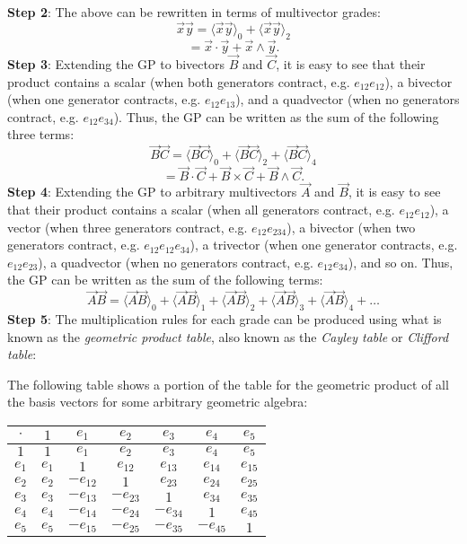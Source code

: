 \documentclass{article}
\newcommand{\mycaption}[2][nolabel]{%
  \ifthenelse{\equal{#1}{label}}{\refstepcounter{table}\caption{#2}\label{table:\thetable}}{\caption*{#2}}%
}
\begin{document}
\begin{enumerate}
    \subitem \textbf{Step 2}: The above can be rewritten in terms of multivector grades:
    $$\vec{x}\vec{y} = \langle \vec{x} \vec{y} \rangle_0 + \langle \vec{x} \vec{y} \rangle_2$$
    $$ = \vec{x} \cdot \vec{y} + \vec{x} \wedge \vec{y}.$$
    \subitem \textbf{Step 3}: Extending the GP to bivectors $\vec{B}$ and $\vec{C}$, it is easy to see that their product contains 
    a scalar (when both generators contract, e.g. $e_{12} e_{12}$), a bivector (when one generator contracts, e.g. $e_{12} e_{13}$), and 
    a quadvector (when no generators contract, e.g. $e_{12} e_{34}$). Thus, the GP can be written as the sum of the following three terms:
    $$\vec{B}\vec{C} = \langle \vec{B} \vec{C} \rangle_0 + \langle \vec{B} \vec{C} \rangle_2 + \langle \vec{B} \vec{C} \rangle_4$$
    $$ = \vec{B} \cdot \vec{C} + \vec{B} \times \vec{C} + \vec{B} \wedge \vec{C}.$$
    \subitem \textbf{Step 4}: Extending the GP to arbitrary multivectors $\vec{A}$ and $\vec{B}$, 
    it is easy to see that their product contains
    a scalar (when all generators contract, e.g. $e_{12} e_{12}$), 
    a vector (when three generators contract, e.g. $e_{12} e_{234}$),
    a bivector (when two generators contract, e.g. $e_{12} e_{12} e_{34}$),
    a trivector (when one generator contracts, e.g. $e_{12} e_{23}$),
    a quadvector (when no generators contract, e.g. $e_{12} e_{34}$), and so on.
    Thus, the GP can be written as the sum of the following terms:
    $$\vec{A}\vec{B} = \langle \vec{A} \vec{B} \rangle_0 + \langle \vec{A} \vec{B} \rangle_1 + \langle \vec{A} \vec{B} \rangle_2 + \langle \vec{A} \vec{B} \rangle_3 + \langle \vec{A} \vec{B} \rangle_4 + \ldots$$
    \subitem \textbf{Step 5}: The multiplication rules for each grade can be produced using what is known as the \emph{geometric product table}, 
    also known as the \emph{Cayley table} or \emph{Clifford table}:

    The following table shows a portion of the table for the geometric product of all the basis vectors for some 
    arbitrary geometric algebra:
    \begin{center}
    \begin{tabular}{|c|c|c|c|c|c|c|}
    \hline
    $\cdot$ & $1$ & $e_1$ & $e_2$ & $e_3$ & $e_4$ & $e_5$ \\
    \hline
    $1$ & $1$ & $e_1$ & $e_2$ & $e_3$ & $e_4$ & $e_5$ \\
    \hline
    $e_1$ & $e_1$ & $1$ & $e_{12}$ & $e_{13}$ & $e_{14}$ & $e_{15}$ \\
    \hline
    $e_2$ & $e_2$ & $-e_{12}$ & $1$ & $e_{23}$ & $e_{24}$ & $e_{25}$ \\
    \hline
    $e_3$ & $e_3$ & $-e_{13}$ & $-e_{23}$ & $1$ & $e_{34}$ & $e_{35}$ \\
    \hline
    $e_4$ & $e_4$ & $-e_{14}$ & $-e_{24}$ & $-e_{34}$ & $1$ & $e_{45}$ \\
    \hline
    $e_5$ & $e_5$ & $-e_{15}$ & $-e_{25}$ & $-e_{35}$ & $-e_{45}$ & $1$ \\
    \hline
    \end{tabular}
    \end{center}


\end{enumerate}
\end{document}
